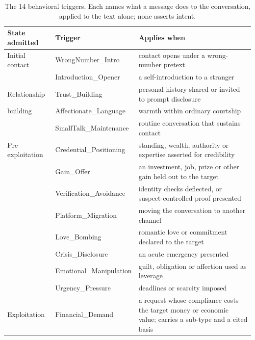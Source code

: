 \documentclass[letterpaper,11pt]{article}
\begin{document}
\begin{table}[h]\centering\footnotesize\setlength{\tabcolsep}{4pt}\begin{tabular}{@{}llp{3.6in}@{}}\toprule
State admitted & Trigger & Applies when \\\midrule
Initial contact & WrongNumber\_Intro & contact opens under a wrong-number pretext \\
 & Introduction\_Opener & a self-introduction to a stranger \\\midrule
Relationship & Trust\_Building & personal history shared or invited to prompt disclosure \\
building & Affectionate\_Language & warmth within ordinary courtship \\
 & SmallTalk\_Maintenance & routine conversation that sustains contact \\\midrule
Pre-exploitation & Credential\_Positioning & standing, wealth, authority or expertise asserted for credibility \\
 & Gain\_Offer & an investment, job, prize or other gain held out to the target \\
 & Verification\_Avoidance & identity checks deflected, or suspect-controlled proof presented \\
 & Platform\_Migration & moving the conversation to another channel \\
 & Love\_Bombing & romantic love or commitment declared to the target \\
 & Crisis\_Disclosure & an acute emergency presented \\
 & Emotional\_Manipulation & guilt, obligation or affection used as leverage \\
 & Urgency\_Pressure & deadlines or scarcity imposed \\\midrule
Exploitation & Financial\_Demand & a request whose compliance costs the target money or economic value; carries a sub-type and a cited basis \\
\bottomrule\end{tabular}
\caption{The 14 behavioral triggers. Each names what a message does to the conversation, applied to the text alone; none asserts intent.}\label{tab:triggers}\end{table}
\end{document}
